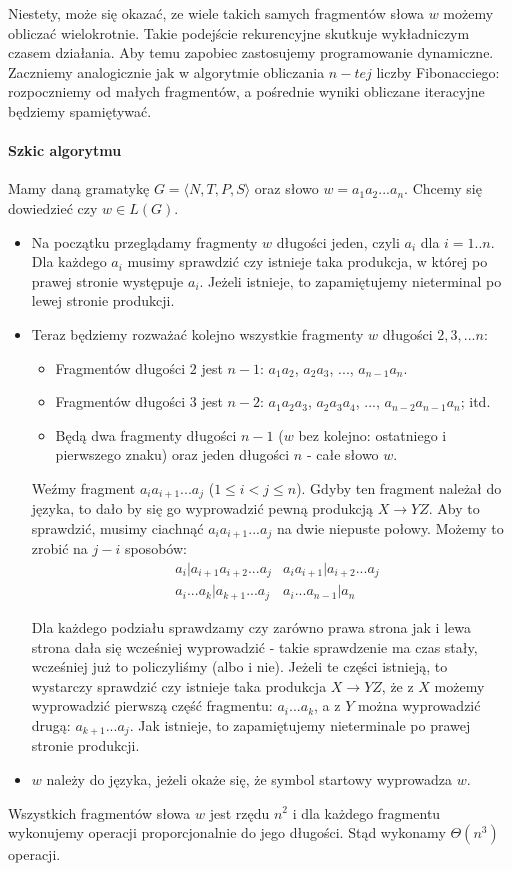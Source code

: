 Niestety, może się okazać, ze wiele takich samych fragmentów słowa $w$ możemy obliczać wielokrotnie.
Takie podejście rekurencyjne skutkuje wykładniczym czasem działania.
Aby temu zapobiec zastosujemy programowanie dynamiczne. 
Zaczniemy analogicznie jak w algorytmie obliczania $n-tej$ liczby Fibonacciego: rozpoczniemy od małych fragmentów, a pośrednie wyniki obliczane iteracyjne będziemy spamiętywać.

\paragraph{Szkic algorytmu} Mamy daną gramatykę  $G = \langle N, T, P, S \rangle$ oraz słowo $w = a_1a_2...a_n$. Chcemy się dowiedzieć czy $w \in L(G)$.
\begin{itemize}
\item Na początku przeglądamy fragmenty $w$ długości jeden, czyli $a_i$ dla $i=1..n$.
Dla każdego $a_i$ musimy sprawdzić czy istnieje taka produkcja, w której po prawej stronie występuje $a_i$. Jeżeli istnieje, to zapamiętujemy nieterminal po lewej stronie produkcji.
\item Teraz będziemy rozważać kolejno wszystkie fragmenty $w$ długości $2,3,...n$:
	\begin{itemize}
		\item Fragmentów długości $2$ jest $n-1$: $a_1a_2$, $a_2a_3$, ..., $a_{n-1}a_n$. 
        \item Fragmentów długości $3$ jest $n-2$: $a_1a_2a_3$, $a_2a_3a_4$, ..., $a_{n-2}a_{n-1}a_n$; itd.
 		\item Będą dwa fragmenty długości $n-1$ ($w$ bez kolejno: ostatniego i pierwszego znaku) oraz jeden długości $n$ - całe słowo $w$.
	\end{itemize}

Weźmy fragment $a_ia_{i+1}...a_j$ ($1 \leq i < j \leq n$).
Gdyby ten fragment należał do języka, to dało by się go wyprowadzić pewną produkcją $X \rightarrow YZ$.
Aby to sprawdzić, musimy ciachnąć $a_ia_{i+1}...a_j$ na dwie niepuste połowy.
Możemy to zrobić na $j-i$ sposobów:
\begin{align*}
&a_i|a_{i+1}a_{i+2}...a_j  &a_ia_{i+1}|a_{i+2}...a_j \\ &a_i...a_k|a_{k+1}...a_j &a_i...a_{n-1}|a_n
\end{align*}

Dla każdego podziału sprawdzamy czy zarówno prawa strona jak i lewa strona dała się wcześniej wyprowadzić - takie sprawdzenie ma czas stały, wcześniej już to policzyliśmy (albo i nie).
Jeżeli te części istnieją, to wystarczy sprawdzić czy istnieje taka produkcja $X \rightarrow YZ$, że z $X$ możemy wyprowadzić pierwszą część fragmentu: $a_i...a_k$, a z $Y$ można wyprowadzić drugą: $a_{k+1}...a_j$. Jak istnieje, to zapamiętujemy nieterminale po prawej stronie produkcji.
\item $w$ należy do języka, jeżeli okaże się, że symbol startowy wyprowadza $w$.

\end{itemize}
Wszystkich fragmentów słowa $w$ jest rzędu $n^2$ i dla każdego fragmentu wykonujemy operacji proporcjonalnie do jego długości. Stąd wykonamy $\Theta(n^3)$ operacji.

